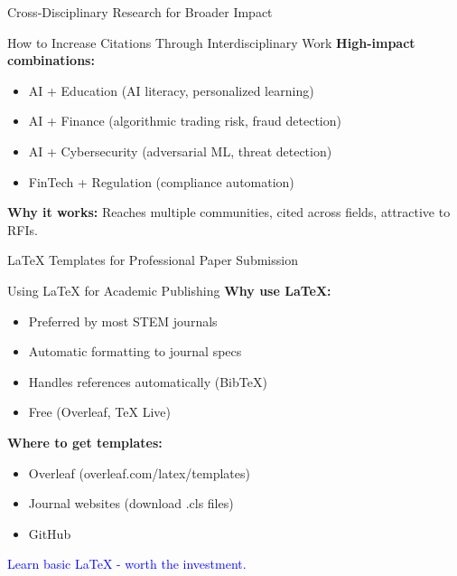 \documentclass[11pt]{beamer}
\begin{document}
	\begin{frame}{Cross-Disciplinary Research for Broader Impact}
		\small
		\begin{block}{How to Increase Citations Through Interdisciplinary Work}
			\textbf{High-impact combinations:}
			\begin{itemize}
				\item AI + Education (AI literacy, personalized learning)
				\item AI + Finance (algorithmic trading risk, fraud detection)
				\item AI + Cybersecurity (adversarial ML, threat detection)
				\item FinTech + Regulation (compliance automation)
			\end{itemize}
			\textbf{Why it works:} Reaches multiple communities, cited across fields, attractive to RFIs.
		\end{block}
	\end{frame}
	
	\begin{frame}{LaTeX Templates for Professional Paper Submission}
		\small
		\begin{block}{Using LaTeX for Academic Publishing}
			\textbf{Why use LaTeX:}
			\begin{itemize}
				\item Preferred by most STEM journals
				\item Automatic formatting to journal specs
				\item Handles references automatically (BibTeX)
				\item Free (Overleaf, TeX Live)
			\end{itemize}
			\textbf{Where to get templates:}
			\begin{itemize}
				\item Overleaf (overleaf.com/latex/templates)
				\item Journal websites (download .cls files)
				\item GitHub
			\end{itemize}
			\textcolor{blue}{Learn basic LaTeX - worth the investment.}
		\end{block}
	\end{frame}
	
\end{document}
